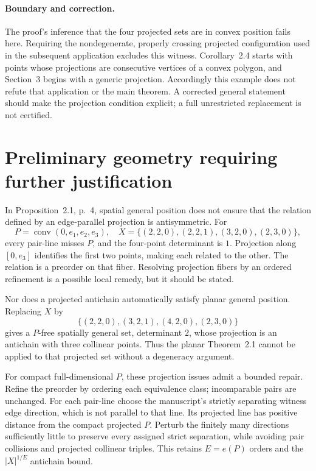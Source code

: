\documentclass[10pt]{article}
\begin{document}
\paragraph*{Boundary and correction.}\mbox{}\par
The proof’s inference that the four projected sets are in convex position fails here. Requiring the nondegenerate, properly crossing projected configuration used in the subsequent application excludes this witness. Corollary 2.4 starts with points whose projections are consecutive vertices of a convex polygon, and Section 3 begins with a generic projection. Accordingly this example does not refute that application or the main theorem. A corrected general statement should make the projection condition explicit; a full unrestricted replacement is not certified.\par
\section*{Preliminary geometry requiring further justification}
In Proposition 2.1, p. 4, spatial general position does not ensure that the relation defined by an edge-parallel projection is antisymmetric. For \[P=\operatorname{conv}(0,e_1,e_2,e_3),\quad
 X=\{(2,2,0),(2,2,1),(3,2,0),(2,3,0)\},\] every pair-line misses \(P\), and the four-point determinant is \(1\). Projection along \([0,e_3]\) identifies the first two points, making each related to the other. The relation is a preorder on that fiber. Resolving projection fibers by an ordered refinement is a possible local remedy, but it should be stated.\par
Nor does a projected antichain automatically satisfy planar general position. Replacing \(X\) by \[\{(2,2,0),(3,2,1),(4,2,0),(2,3,0)\}\] gives a \(P\)-free spatially general set, determinant \(2\), whose projection is an antichain with three collinear points. Thus the planar Theorem 2.1 cannot be applied to that projected set without a degeneracy argument.\par
For compact full-dimensional \(P\), these projection issues admit a bounded repair. Refine the preorder by ordering each equivalence class; incomparable pairs are unchanged. For each pair-line choose the manuscript’s strictly separating witness edge direction, which is not parallel to that line. Its projected line has positive distance from the compact projected \(P\). Perturb the finitely many directions sufficiently little to preserve every assigned strict separation, while avoiding pair collisions and projected collinear triples. This retains \(E=e(P)\) orders and the \(|X|^{1/E}\) antichain bound.\par
\end{document}
